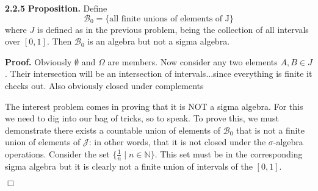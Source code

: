 \documentclass{article}
\begin{document}
\noindent \textbf{2.2.5} \textbf{Proposition.} Define \[\mathcal{B}_0 = \{\text{all finite unions of elements of J}\}\] where $J$ is defined as in the previous problem, being the collection of all intervals over $[0,1]$. Then $\mathcal{B}_0$ is an algebra but not a sigma algebra.

\medskip

\noindent \textbf{Proof.} Obviously $\emptyset$ and $\Omega$ are members. Now consider any two elements $A, B \in J$. Their intersection will be an intersection of intervals...since everything is finite it checks out. Also obviously closed under complements

The interest problem comes in proving that it is NOT a sigma algebra. For this we need to dig into our bag of tricks, so to speak. To prove this, we must demonstrate there exists a countable union of elements of $\mathcal{B}_0$ that is not a finite union of elements of $\mathcal{J}$: in other words, that it is not closed under the $\sigma$-algebra operations. Consider the set $\{ \frac{1}{n} \mid n \in \mathbb{N} \}$. This set must be in the corresponding sigma algebra but it is clearly not a finite union of intervals of the $[0,1]$. 

\hfill $\Box$
\end{document}
